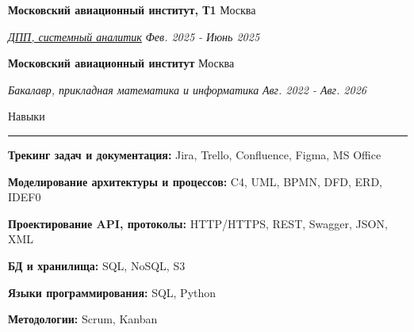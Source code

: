 \documentclass[14pt, a4paper, oneside]{extarticle}
\begin{document}

\begin{flushleft}
	\vspace{-0.8\intextsep}
	\quad
	\textbf{Московский авиационный институт, Т1}
	\hfill
	Москва
\end{flushleft}

\begin{flushleft}
	\vspace{-\intextsep}
	\quad
	\href{https://github.com/Crazy5202/job_application_form/tree/main/portfolio/T1/%D0%A21_%D1%81%D0%B5%D1%80%D1%82%D0%B8%D1%84%D0%B8%D0%BA%D0%B0%D1%82.pdf}{\textit{ДПП, системный аналитик}}
	\hfill
	\textit{\small Фев. 2025 - Июнь 2025}
\end{flushleft}


\begin{flushleft}
	\vspace{-0.8\intextsep}
	\quad
	\textbf{Московский авиационный институт}
	\hfill
	Москва
\end{flushleft}

\begin{flushleft}
	\vspace{-\intextsep}
	\quad
	\textit{Бакалавр, прикладная математика и информатика}
	\hfill
	\textit{\small Авг. 2022 - Авг. 2026}
\end{flushleft}


\begin{flushleft}
	\vspace{-\intextsep}
	\large Навыки
\end{flushleft}

\vspace{-0.8\intextsep}
\hrule


\vspace{0.5\intextsep}

\textbf{Трекинг задач и документация:} Jira, Trello, Confluence, Figma, MS Office

\textbf{Моделирование архитектуры и процессов:} C4, UML, BPMN, DFD, ERD, IDEF0

\textbf{Проектирование API, протоколы:} HTTP/HTTPS, REST, Swagger, JSON, XML

\textbf{БД и хранилища:} SQL, NoSQL, S3

\textbf{Языки программирования:} SQL, Python

\textbf{Методологии:} Scrum, Kanban 
\end{document}
